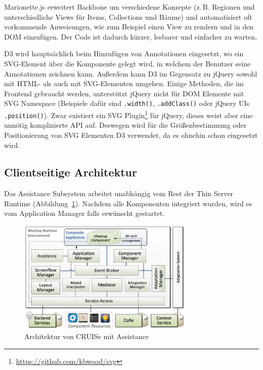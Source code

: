 \documentclass[
	headsepline,
	footsepline,
	fontsize=12pt,
	bibliography=totoc
]{scrbook}
\begin{document}
Marionette.js erweitert Backbone um verschiedene Konzepte (z.\,B. Regionen und unterschiedliche Views für Items, Collections und Bäume) und automatisiert oft vorkommende Anweisungen, wie zum Beispiel einen View zu rendern und in den DOM einzufügen. Der Code ist dadurch kürzer, lesbarer und einfacher zu warten.

D3 wird hauptsächlich beim Hinzufügen von Annotationen eingesetzt, wo ein SVG-Element über die Komponente gelegt wird, in welchem der Benutzer seine Annotationen zeichnen kann. Außerdem kann D3 im Gegensatz zu jQuery sowohl mit HTML- als auch mit SVG-Elementen umgehen. Einige Methoden, die im Frontend gebraucht werden, unterstützt jQuery nicht für DOM Elemente mit SVG Namespace (Beispiele dafür sind \texttt{.width()}, \texttt{.addClass()} oder jQuery UIs \texttt{.position()}). Zwar existiert ein SVG Plugin\footnote{\url{https://github.com/kbwood/svg}} für jQuery, dieses weist aber eine unnötig komplizierte API auf. Deswegen wird für die Größenbestimmung oder Positionierung von SVG Elementen D3 verwendet, da es ohnehin schon eingesetzt wird.

\subsection{Clientseitige Architektur}
\label{section:implementierung:frontend:architektur}

Das Assistance Subsystem arbeitet unabhängig vom Rest der Thin Server Runtime (Abbildung~\ref{figure:cruise-architektur-assistance}). Nachdem alle Komponenten integriert wurden, wird es vom Application Manager falls erwünscht gestartet.

\begin{figure}[htbp]
   \centering
   \includegraphics[width=0.75\textwidth]{images/implementierung-cruise-architektur.png}
   \caption{Architektur von CRUISe mit Assistance}
   \label{figure:cruise-architektur-assistance}
\end{figure}
\end{document}
